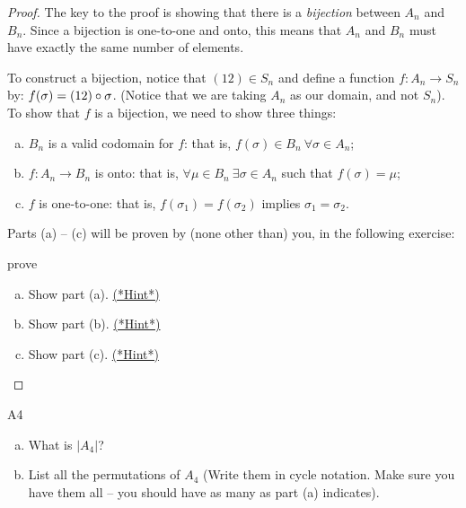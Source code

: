  \begin{proof}
The key to the proof is showing that there is a \emph{bijection} between $A_n$  and $B_n$. Since a bijection is one-to-one and onto, this means that $A_n$ and $B_n$ must have
exactly the same number of elements.

To construct a bijection, notice that $(1 2) \in S_n$ and define a function $f: A_n \rightarrow S_n$ by: $f(\sigma) = (1 2) \circ \sigma$. (Notice that we are taking $A_n$ as our domain, and not $S_n$).
To show that $f$ is a bijection, we need to show three things:
\begin{enumerate}[(a)]
\item
$B_n$ is a valid codomain for $f$: that is, $f(\sigma) \in B_n ~\forall \sigma \in A_n$;
\item
$f:A_n \rightarrow B_n$ is onto: that is, $\forall \mu \in B_n ~\exists \sigma \in A_n$ such that $f(\sigma) = \mu$;
 \item
$f$ is one-to-one: that is, $f(\sigma_1) = f(\sigma_2)$ implies $\sigma_1 = \sigma_2$.
\end{enumerate}

Parts (a) -- (c) will be proven by (none other than) you, in the following exercise:

\begin{exercise}{prove}
\begin{enumerate}[(a)]
\item
Show part (a).  
\hyperref[sec:Permutations:Hints]{(*Hint*)}
\item
Show part (b). 
\hyperref[sec:Permutations:Hints]{(*Hint*)}
\item
Show part (c). 
\hyperref[sec:Permutations:Hints]{(*Hint*)}
\end{enumerate}
\end{exercise}

\end{proof}
 
\begin{exercise}{A4}
\begin{enumerate}[(a)]
\item 
What is $| A_4 |$?
\item
List all the permutations of $A_4$ (Write them in cycle notation. Make sure you have them all -- you should have as many as part (a) indicates).
\end{enumerate}
\end{exercise}

